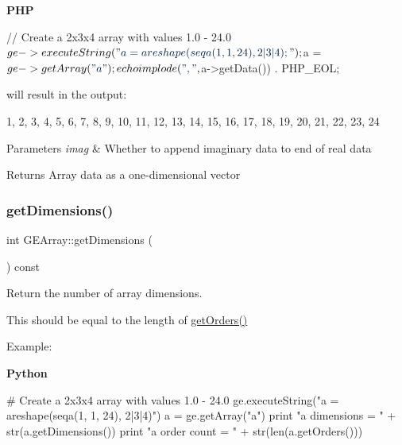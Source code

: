 {\bfseries P\+HP} 
\begin{DoxyCode}
\textcolor{comment}{// Create a 2x3x4 array with values 1.0 - 24.0}
$ge->executeString(\textcolor{stringliteral}{"a = areshape(seqa(1, 1, 24), 2|3|4);"});
$a = $ge->getArray(\textcolor{stringliteral}{"a"});
echo implode(\textcolor{stringliteral}{", "}, $a->getData()) . PHP\_EOL;
\end{DoxyCode}
 will result in the output\+: 
\begin{DoxyCode}
1, 2, 3, 4, 5, 6, 7, 8, 9, 10, 11, 12, 13, 14, 15, 16, 17, 18, 19, 20, 21, 22, 23, 24
\end{DoxyCode}



\begin{DoxyParams}{Parameters}
{\em imag} & Whether to append imaginary data to end of real data \\
\hline
\end{DoxyParams}
\begin{DoxyReturn}{Returns}
Array data as a one-\/dimensional vector 
\end{DoxyReturn}
\mbox{\label{class_g_e_array_a5823413a0fa7b8bb6a021441c5f21311}} 
\subsubsection{\texorpdfstring{get\+Dimensions()}{getDimensions()}}
{\footnotesize\ttfamily int G\+E\+Array\+::get\+Dimensions (\begin{DoxyParamCaption}{ }\end{DoxyParamCaption}) const}



Return the number of array dimensions. 

This should be equal to the length of \hyperlink{class_g_e_array_a1a0335f73a61e044895f40a8dc89b4c6}{get\+Orders()}

Example\+:

{\bfseries Python} 
\begin{DoxyCode}
\textcolor{comment}{# Create a 2x3x4 array with values 1.0 - 24.0}
ge.executeString(\textcolor{stringliteral}{"a = areshape(seqa(1, 1, 24), 2|3|4)"})
a = ge.getArray(\textcolor{stringliteral}{"a"})
\textcolor{keywordflow}{print} \textcolor{stringliteral}{"a dimensions = "} + str(a.getDimensions())
\textcolor{keywordflow}{print} \textcolor{stringliteral}{"a order count = "} + str(len(a.getOrders()))
\end{DoxyCode}


